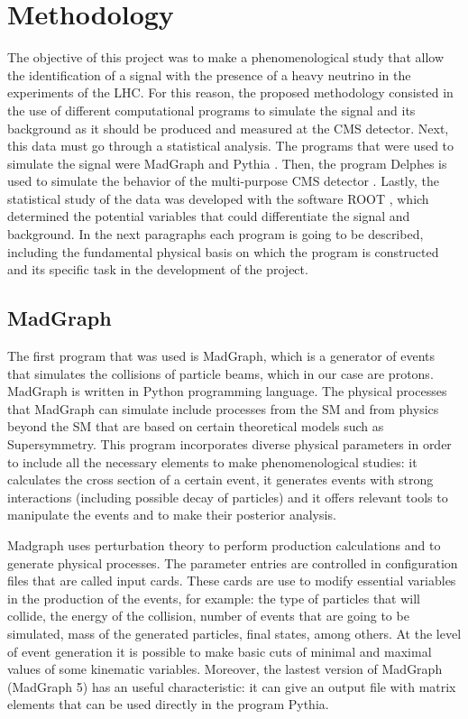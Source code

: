 \chapter{Methodology} 
\label{Methodology_chapter}

The objective of this project was to make a phenomenological study that allow the identification of a signal with the presence of a heavy neutrino in the experiments of the LHC. For this reason, 
the proposed methodology consisted in the use of different computational programs to simulate the signal and its background as it should be produced and measured at the CMS detector. Next, this data must go through a statistical analysis. The programs that were used to simulate the signal were MadGraph \cite{MadGraph 1, MadGraph 2} and Pythia \cite{Pythia}. Then, the program Delphes is used to simulate the behavior of the multi-purpose CMS detector \cite{Delphes}. Lastly, the statistical study of the data was developed with the software ROOT \cite{Root}, which determined the potential variables that could differentiate the signal and background. In the next paragraphs each program is going to be described, including the fundamental physical basis on which the program is constructed and its specific task in the development of the project.

\section{MadGraph}

The first program that was used is MadGraph, which is a generator of events that simulates the collisions of particle beams, which in our case are protons. MadGraph is written in Python programming language. The physical processes that MadGraph can simulate include processes from the SM and from physics beyond the SM that are based on certain theoretical models such as Supersymmetry. This program incorporates diverse physical parameters in order to include all the necessary elements to make phenomenological studies: it calculates the cross section of a certain event, it generates events with strong interactions (including possible decay of particles) and it offers relevant tools to manipulate the events and to make their posterior analysis. 

Madgraph uses perturbation theory to perform production calculations and to generate physical processes. The parameter entries are controlled in configuration files that are called input cards. 
These cards are use to modify essential variables in the production of the events, for example: the type of particles that will collide, the energy of the collision, number of events that are going to be simulated, mass of the generated particles, final states, among others. At the level of event generation it is possible to make basic cuts of minimal and maximal values of some kinematic variables. Moreover, the lastest version of MadGraph (MadGraph 5) has an useful characteristic: it can give an output file with matrix elements that can be used directly in the program Pythia. 

